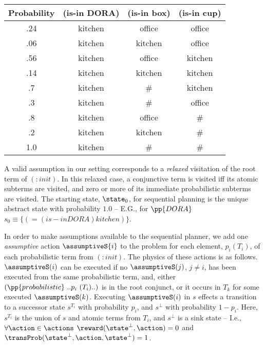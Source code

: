 \small
\begin{tabular}{cccc}
\hline
Probability & (is-in DORA)  & (is-in box)  & (is-in cup) \\
\hline
.24 & kitchen & office & office \\
.06 & kitchen & kitchen & office \\
.56 & kitchen & office & kitchen \\
.14 & kitchen & kitchen & kitchen \\
.7 & kitchen & \# &  kitchen\\
.3 & kitchen & \# & office \\
.8 & kitchen & office & \# \\
.2 & kitchen & kitchen & \# \\
1.0 & kitchen & \# & \# \\
\hline
\end{tabular}
\normalsize

\noindent A valid assumption in our setting corresponds to a {\em
relaxed} visitation of the root term of $(:init)$. In this relaxed
case, a conjunctive term is visited iff its atomic subterms are
visited, and zero or more of its immediate probabilistic subterms are
visited. The starting state, $\state_0$, for sequential planning is
the unique abstract state with probability $1.0$ -- E.G., for
$\pp{DORA}$ $s_0 \equiv \{(= (is-in DORA) kitchen)\}$.

In order to make assumptions available to the sequential planner, we
add one {\em assumptive} action $\assumptiveS{i}$ to the problem for
each element, $p_i (T_i)$, of each probabilistic term from
$(:init)$. The physics of these actions is as
follows. $\assumptiveS(i)$ can be executed if no $\assumptiveS(j)$,
$j \neq i$, has been executed from the same probabilistic term, and,
either $(\pp{probabilistic}~..p_i~(T_i)..)$ is in the root conjunct,
or it occurs in $T_k$ for some executed $\assumptiveS(k)$.
Executing $\assumptiveS(i)$ in $s$ effects a transition to a
successor state $s^{T_i}$ with probability $p_i$, and $s^\bot$ with
probability $1 - p_i$. Here, $s^{T_i}$ is the union of $s$ and atomic
terms from $T_i$, and $s^\bot$ is a sink state -- I.e.,
$\forall\action\in\actions$ $\reward(\state^\bot, \action) = 0$ and
$\transProb(\state^\bot, \action, \state^\bot) = 1$.

